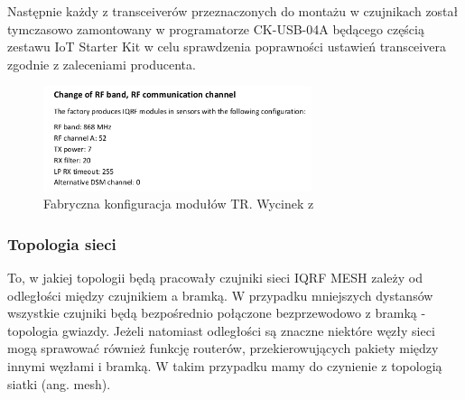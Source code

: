 \documentclass[a4paper, 12pt]{article}
\begin{document}
Następnie każdy z transceiverów przeznaczonych do montażu w czujnikach został tymczasowo zamontowany w programatorze CK-USB-04A będącego częścią
zestawu IoT Starter Kit w celu sprawdzenia poprawności ustawień transceivera zgodnie z zaleceniami producenta.

\begin{figure}[H]
    \centering
    \includegraphics[width=0.7\textwidth]{zdj/protronix-settings.png}
    \caption{Fabryczna konfiguracja modułów TR. Wycinek z \cite{protronix-comms}}
\end{figure}

\subsubsection{Topologia sieci}

To, w jakiej topologii będą pracowały czujniki sieci IQRF MESH zależy od odległości między czujnikiem a bramką. W przypadku 
mniejszych dystansów wszystkie czujniki będą bezpośrednio połączone bezprzewodowo z bramką - topologia gwiazdy. Jeżeli natomiast
odległości są znaczne niektóre węzły sieci mogą sprawować również funkcję routerów, przekierowujących pakiety między innymi 
węzłami i bramką. W takim przypadku mamy do czynienie z topologią siatki (ang. mesh).
\end{document}
